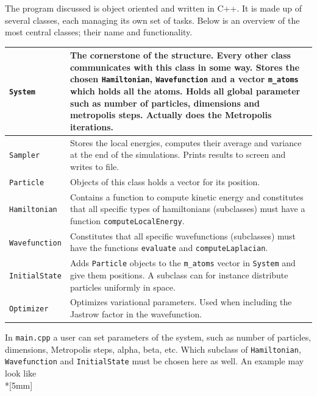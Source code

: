 \documentclass[english, a4paper]{article}
\begin{document}
The program discussed is object oriented and written in C++. It is made up of several classes, each managing its own set of tasks. 
Below is an overview of the most central classes; their name and functionality.
\renewcommand{\arraystretch}{1.8}
\begin{table}[H]
	\centering
	\begin{tabularx}{\textwidth}{ p{2.5cm}  p{14.5cm} }
		\hline
		\texttt{System}& The cornerstone of the structure. Every other class communicates with this class in some way. \newline
		Stores the chosen \texttt{Hamiltonian}, \texttt{Wavefunction} and  a vector \texttt{m\_atoms} which holds all the atoms. 
		Holds all global parameter such as number of particles, dimensions and metropolis steps. \newline
		Actually does the Metropolis iterations.\\*
		\hline
		\texttt{Sampler}& Stores the local energies, computes their average and variance at the end of the simulations.
		Prints results to screen and writes to file.\\*		
		\hline
		\texttt{Particle}& Objects of this class holds a vector for its position.\\*
		\hline
		\texttt{Hamiltonian}& Contains a function to compute kinetic energy and constitutes that all specific types of
		hamiltonians (subclasses) must have a function \texttt{computeLocalEnergy}.\\*  
		\hline
		\texttt{Wavefunction}& Constitutes that all specific wavefunctions (subclasses) must have the functions \texttt{evaluate} and
		\texttt{computeLaplacian}.\\*
		\hline
		\texttt{InitialState}& Adds \texttt{Particle} objects to the \texttt{m\_atoms} vector in \texttt{System} and give them positions.
		A subclass can for instance distribute particles uniformly in space.\\*
		\hline
		\texttt{Optimizer}& Optimizes variational parameters. Used when including the Jastrow factor in the wavefunction.\\*
		\hline
	\end{tabularx}
\end{table}
In \texttt{main.cpp} a user can set parameters of the system, such as number of particles, dimensions, Metropolis steps, alpha, beta, etc.
Which subclass of \texttt{Hamiltonian}, \texttt{Wavefunction} and \texttt{InitialState} must be chosen here as well. An example may look like \\*[5mm]
\end{document}
